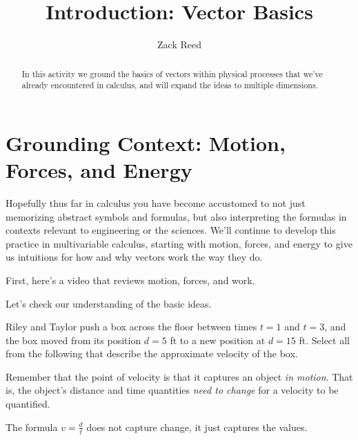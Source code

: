 \documentclass{ximera}
\title{Introduction: Vector Basics}
\author{Zack Reed}
\begin{document}
\begin{abstract}
In this activity we ground the basics of vectors within physical processes that we've already encountered in calculus, and will expand the ideas to multiple dimensions.
\end{abstract}
\maketitle

\section*{Grounding Context: Motion, Forces, and Energy}
Hopefully thus far in calculus you have become accustomed to not just memorizing abstract symbols and formulas, but also interpreting the formulas in contexts relevant to engineering or the sciences. We'll continue to develop this practice in multivariable calculus, starting with motion, forces, and energy to give us intuitions for how and why vectors work the way they do.

First, here's a video that reviews motion, forces, and work.

\begin{center}
\end{center}

Let's check our understanding of the basic ideas.

\begin{problem}
Riley and Taylor push a box across the floor between times $t=1$ and $t=3$, and the box moved from its position $d=5$ ft to a new position at $d=15$ ft. Select all from the following that describe the approximate velocity of the box.
\begin{selectAll}
\end{selectAll}
\begin{feedback}
Remember that the point of velocity is that it captures an object \emph{in motion}. That is, the object's distance and time quantities \emph{need to change} for a velocity to be quantified. 

The formula $v=\frac{d}{t}$ does not capture change, it just captures the values.
\end{feedback}
\end{problem}
\end{document}
